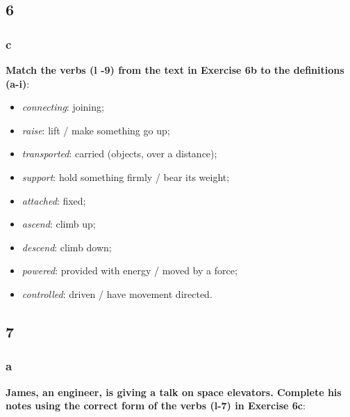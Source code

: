 \subsection{6}

\subsubsection{c}

\textbf{Match the verbs (l -9) from the text in Exercise 6b to the definitions (a-i)}:

\begin{itemize}

\item \textit{connecting}: joining;
\item \textit{raise}: lift / make something go up;
\item \textit{transported}: carried (objects, over a distance);
\item \textit{support}: hold something firmly / bear its weight;
\item \textit{attached}: fixed;
\item \textit{ascend}: climb up;
\item \textit{descend}: climb down;
\item \textit{powered}: provided with energy / moved by a force;
\item \textit{controlled}: driven / have movement directed.

\end{itemize}

\subsection{7}

\subsubsection{a}

\textbf{James, an engineer, is giving a talk on space elevators. Complete his notes using the correct form of the verbs (l-7) in Exercise 6c}:


